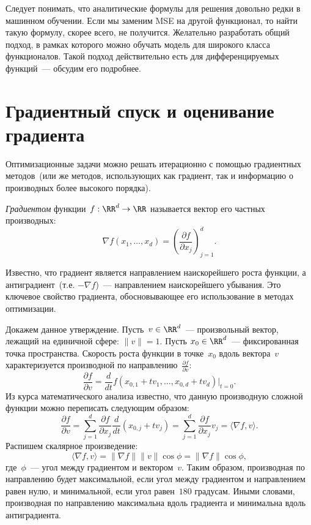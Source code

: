 \documentclass[12pt,fleqn]{article}
\begin{document}
Следует понимать, что аналитические формулы для решения довольно редки в машинном обучении.
Если мы заменим MSE на другой функционал, то найти такую формулу, скорее всего, не получится.
Желательно разработать общий подход, в рамках которого можно обучать модель для широкого
класса функционалов.
Такой подход действительно есть для дифференцируемых функций~--- обсудим его подробнее.

\section{Градиентный спуск и оценивание градиента}

Оптимизационные задачи  можно решать итерационно
с помощью градиентных методов~(или же методов, использующих
как градиент, так и информацию о производных более высокого порядка).

\emph{Градиентом} функции~$f: \RR^d \to \RR$ называется вектор его частных производных:
\[
    \nabla f(x_1, \dots, x_d) = \left( \frac{\partial f}{\partial x_j} \right)_{j = 1}^{d}.
\]

Известно, что градиент является направлением наискорейшего роста функции,
а антиградиент~(т.е. $-\nabla f$)~--- направлением наискорейшего убывания.
Это ключевое свойство градиента, обосновывающее его использование в методах оптимизации.

Докажем данное утверждение.
Пусть~$v \in \RR^d$~--- произвольный вектор, лежащий на единичной сфере: $\|v\| = 1$.
Пусть $x_0 \in \RR^d$~--- фиксированная точка пространства.
Скорость роста функции в точке~$x_0$ вдоль вектора~$v$ характеризуется
производной по направлению~$\frac{\partial f}{\partial v}$:
\[
    \frac{\partial f}{\partial v}
    =
    \frac{d}{dt} f(x_{0,1} + t v_1, \dots, x_{0,d} + t v_d) |_{t = 0}.
\]
Из курса математического анализа известно, что данную производную сложной
функции можно переписать следующим образом:
\[
    \frac{\partial f}{\partial v}
    =
    \sum_{j = 1}^{d}
        \frac{\partial f}{\partial x_j}
        \frac{d}{dt} \left(x_{0,j} + t v_j\right)
    =
    \sum_{j = 1}^{d}
        \frac{\partial f}{\partial x_j}
        v_j
    =
    \langle \nabla f, v \rangle.
\]
Распишем скалярное произведение:
\[
    \langle \nabla f, v \rangle
    =
    \|\nabla f\| \|v\| \cos \phi
    =
    \|\nabla f\| \cos \phi,
\]
где~$\phi$~--- угол между градиентом и вектором~$v$.
Таким образом, производная по направлению будет
максимальной, если угол между градиентом и направлением равен нулю,
и минимальной, если угол равен~$180$ градусам.
Иными словами, производная по направлению максимальна
вдоль градиента и минимальна вдоль антиградиента.
\end{document}

